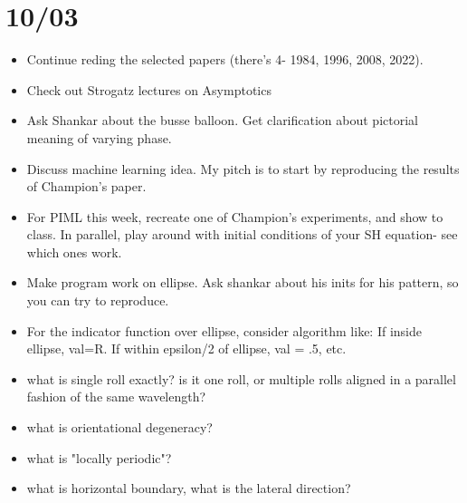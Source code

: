 \documentclass[12pt]{article}
\begin{document}
\section{10/03}
\begin{itemize}
\item Continue reding the selected papers (there's 4- 1984, 1996, 2008, 2022).
\item Check out Strogatz lectures on Asymptotics
\item Ask Shankar about the busse balloon. Get clarification about pictorial meaning of varying phase.
\item Discuss machine learning idea. My pitch is to start by reproducing the results of Champion's paper.
\item For PIML this week, recreate one of Champion's experiments, and show to class. In parallel, play around with initial conditions of your SH equation- see which ones work.
\item Make program work on ellipse. Ask shankar about his inits for his pattern, so you can try to reproduce.
\item For the indicator function over ellipse, consider algorithm like: If inside ellipse, val=R. If within epsilon/2 of ellipse, val = .5, etc.
\item what is single roll exactly? is it one roll, or multiple rolls aligned in a parallel fashion of the same wavelength?
\item what is orientational degeneracy?
\item what is "locally periodic"?
\item what is horizontal boundary, what is the lateral direction?
\end{itemize}
\end{document}
